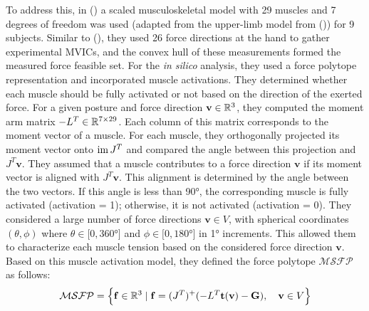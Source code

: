 To address this, in (\cite{hernandezIsometricForceCapabilities2015}) a scaled musculoskeletal model with 29 muscles and 7 degrees of freedom was used (adapted from the upper-limb model from (\cite{holzbaurModelUpperExtremity2005})) for 9 subjects. Similar to (\cite{rezzougUpperLimbIsometricForce2021b}), they used 26 force directions at the hand to gather experimental MVICs, and the convex hull of these measurements formed the measured force feasible set. For the \emph{in silico} analysis, they used a force polytope representation and incorporated muscle activations. They determined whether each muscle should be fully activated or not based on the direction of the exerted force. For a given posture and force direction $\mathbf{v}\in\mathbb{R}^3$, they computed the moment arm matrix $-L^T \in \mathbb{R}^{7\times 29}$. Each column of this matrix corresponds to the moment vector of a muscle. For each muscle, they orthogonally projected its moment vector onto $\operatorname{im}{J^T}$ and compared the angle between this projection and $J^T\mathbf{v}$. They assumed that a muscle contributes to a force direction $\mathbf{v}$ if its moment vector is aligned with $J^T\mathbf{v}$. This alignment is determined by the angle between the two vectors. If this angle is less than 90°, the corresponding muscle is fully activated (activation = 1); otherwise, it is not activated (activation = 0). They considered a large number of force directions $\mathbf{v}\in V$, with spherical coordinates $(\theta, \phi)$ where $\theta \in [0, 360$°$]$ and $\phi\in[0,180$°$]$ in 1° increments. This allowed them to characterize each muscle tension based on the considered force direction $\mathbf{v}$. Based on this muscle activation model, they defined the force polytope $\mathcal{MSFP}$ as follows:
\begin{align*}
    \mathcal{MSFP} = \left\{ \mathbf{f} \in\mathbb{R}^3 \mid \mathbf{f} = (J^T)^+(-L^T\mathbf{t}(\mathbf{v}) - \mathbf{G}), \quad \mathbf{v}\in V \right\}
\end{align*}


